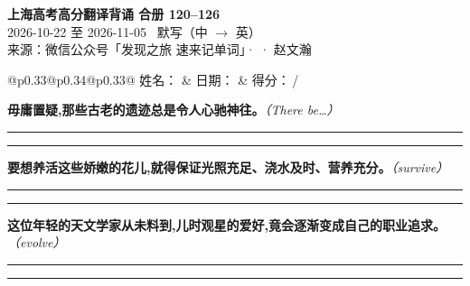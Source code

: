 \documentclass[11pt,a4paper]{article}
\newcommand{\num}[1]{\makebox[1.9em][r]{#1.}\hspace{0.3em}}
\newcommand{\wline}{\noindent\rule{\linewidth}{0.4pt}}
\newcommand{\prompt}[1]{\emph{\textcolor{tipblue}{\small（#1）}}}
\begin{document}
\pagestyle{plain}
\begin{center}
{\LARGE\bfseries 上海高考高分翻译背诵 \quad 合册 120–126}\\[0.25em]
{\large 2026-10-22 至 2026-11-05 \quad\ 默写（中 $\to$ 英）}\\[0.35em]
{\footnotesize 来源：微信公众号「发现之旅 速来记单词」·  · 赵文瀚}
\end{center}

\vspace{0.4em}
\noindent\begin{tabular}{@{}p{0.33\textwidth}@{}p{0.34\textwidth}@{}p{0.33\textwidth}@{}}
姓名：\underline{\hspace{2.0cm}} & 日期：\underline{\hspace{2.0cm}} & 得分：\underline{\hspace{1.4cm}}\,/ \\
\end{tabular}

\vspace{0.5em}

\vspace{0.8em}
\vspace{0.35em}\vspace{0.15em}

\begin{minipage}{\linewidth}

\num{1}\textbf{毋庸置疑,那些古老的遗迹总是令人心驰神往。}\prompt{There be…}

\vspace{0.3em}

\wline\vspace{0.3em}
\wline

\end{minipage}

\begin{minipage}{\linewidth}

\num{2}\textbf{要想养活这些娇嫩的花儿,就得保证光照充足、浇水及时、营养充分。}\prompt{survive}

\vspace{0.3em}

\wline\vspace{0.3em}
\wline

\end{minipage}

\begin{minipage}{\linewidth}

\num{3}\textbf{这位年轻的天文学家从未料到,儿时观星的爱好,竟会逐渐变成自己的职业追求。}\prompt{evolve}

\vspace{0.3em}

\wline\vspace{0.3em}
\wline

\end{minipage}
\end{document}
